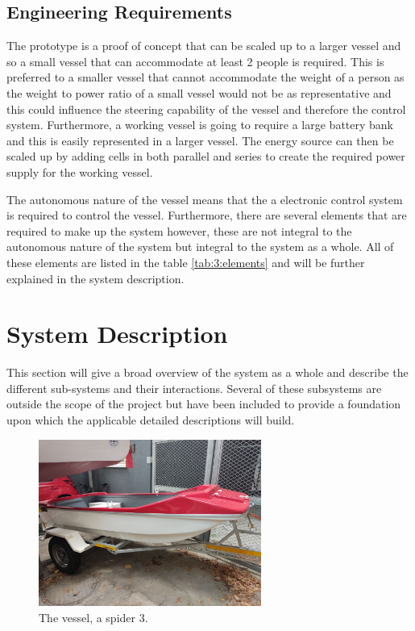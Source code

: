 	\subsection{Engineering Requirements}
	The prototype is a proof of concept that can be scaled up to a larger vessel and so a small vessel that can accommodate at least 2 people is required. This is preferred to a smaller vessel that cannot accommodate the weight of a person as the weight to power ratio of a small vessel would not be as representative and this could influence the steering capability of the vessel and therefore the control system.
	Furthermore, a working vessel is going to require a large battery bank and this is easily represented in a larger vessel. The energy source can then be scaled up by adding cells in both parallel and series to create the required power supply for the working vessel.\par
	The autonomous nature of the vessel means that the a electronic control system is required to control the vessel. Furthermore, there are several elements that are required to make up the system however, these are not integral to the autonomous nature of the system but integral to the system as a whole. All of these elements are listed in the table \ref{tab:3:elements} and will be further explained in the system description.\par
\section{System Description}
This section will give a broad overview of the system as a whole and describe the different sub-systems and their interactions. Several of these subsystems are outside the scope of the project but have been included to provide a foundation upon which the applicable detailed descriptions will build. \par
\begin{figure}
	\begin{center}
		\includegraphics[width = 0.65\textwidth]{figures/spider3.jpg}
		\caption{The vessel, a spider 3.}
		\label{fig:3:spider}
	\end{center}
\end{figure}
